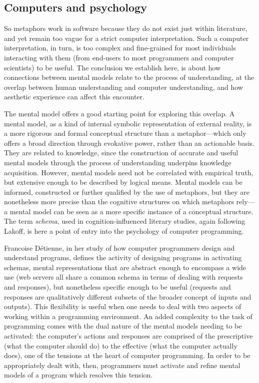 \documentclass{article}
\begin{document}
\subsection{Computers and psychology}

So metaphors work in software because they do not exist just within literature, and yet remain too vague for a strict computer interpretation. Such a computer interpretation, in turn, is too complex and fine-grained for most individuals interacting with them (from end-users to most programmers and computer scientists) to be useful. The conclusion we establish here, is about how connections between mental models relate to the process of understanding, at the overlap between human understanding and computer understanding, and how aesthetic experience can affect this encounter.

The mental model offers a good starting point for exploring this overlap. A mental model, as a kind of internal symbolic representation of external reality, is a more rigorous and formal conceptual structure than a metaphor—which only offers a broad direction through evokative power, rather than an actionable basis. They are related to knowledge, since the construction of accurate and useful mental models through the process of understanding underpins knowledge acquisition. However, mental models need not be correlated with empirical truth, but extensive enough to be described by logical means. Mental models can be informed, constructed or further qualified by the use of metaphors, but they are nonetheless more precise than the cognitive structures on which metaphors rely—a mental model can be seen as a more specific instance of a conceptual structure. The term \emph{schema}, used in cognition-influenced literary studies, again following Lakoff, is here a point of entry into the psychology of computer programming.

Francoise Détienne, in her study of how computer programmers design and understand programs\cite{detienne_software_2012}, defines the activity of designing programs in activating schemas, mental representations that are abstract enough to encompass a wide use (web servers all share a common schema in terms of dealing with requests and responses), but nonetheless specific enough to be useful (requests and responses are qualitatively different subsets of the broader concept of inputs and outputs). This flexibility is useful when one needs to deal with two aspects of working within a programming environment. An added complexity to the task of programming comes with the dual nature of the mental models needing to be activated: the computer's actions and responses are comprised of the prescriptive (what the computer should do) to the effective (what the computer actually does), one of the tensions at the heart of computer programming. In order to be appropriately dealt with, then, programmers must activate and refine mental models of a program which resolves this tension.
\end{document}
